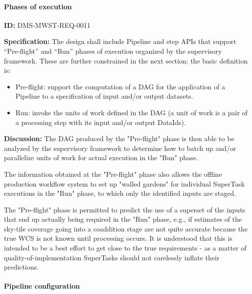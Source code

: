 \documentclass[SE,toc,lsstdraft]{lsstdoc}
\begin{document}
\paragraph{Phases of execution}\hfill  %

\label{DMS-MWST-REQ-0011}
\textbf{ID:} DMS-MWST-REQ-0011

\textbf{Specification:}
The design shall include Pipeline and step APIs that support “Pre-flight” and “Run” phases of execution organized by the supervisory framework. These are further constrained in the next section; the basic definition is:

    \begin{itemize}
\item
Pre-flight: support the computation of a DAG for the application of a Pipeline to a specification of input and/or output datasets.

\item
Run: invoke the units of work defined in the DAG (a unit of work is a pair of a processing step with its input and/or output DataIds).

    \end{itemize}

\textbf{Discussion:}
The DAG produced by the "Pre-flight" phase is then able to be analyzed by the supervisory framework to determine how to batch up and/or parallelize units of work for actual execution in the "Run" phase.

The information obtained at the "Pre-flight" phase also allows the offline production workflow system to set up "walled gardens" for individual SuperTask executions in the "Run" phase, to which only the identified inputs are staged.

The "Pre-flight" phase is permitted to predict the use of a superset of the inputs that end up actually being required in the "Run" phase, e.g., if estimates of the sky-tile coverage going into a coaddition stage are not quite accurate because the true WCS is not known until processing occurs. It is understood that this is intended to be a best effort to get close to the true requirements - as a matter of quality-of-implementation SuperTasks should not carelessly inflate their predictions.

\paragraph{Pipeline configuration}\hfill  %
\end{document}
